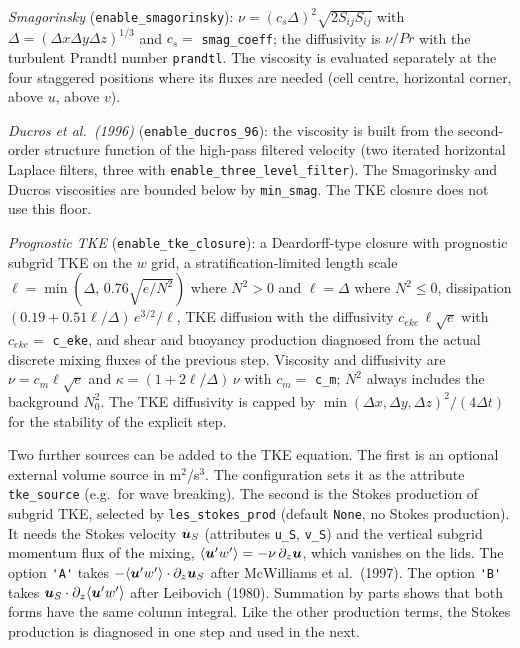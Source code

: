 \documentclass[12pt]{article}
\renewcommand{\v}[1]{{\mbox{\boldmath$ #1 $}}}  %
\newcommand{\pz}[1]{{\partial_z #1}}
\begin{document}
\emph{Smagorinsky} (\verb|enable_smagorinsky|):
$\nu = (c_s \Delta)^2 \sqrt{2 S_{ij} S_{ij}}$ with
$\Delta = (\Delta x \Delta y \Delta z)^{1/3}$ and
$c_s = $ \verb|smag_coeff|; the diffusivity is $\nu/Pr$ with the turbulent
Prandtl number \verb|prandtl|. The viscosity is evaluated separately at
the four staggered positions where its fluxes are needed (cell centre,
horizontal corner, above $u$, above $v$).

\emph{Ducros et al.\ (1996)} (\verb|enable_ducros_96|): the viscosity is
built from the second-order structure function of the high-pass filtered
velocity (two iterated horizontal Laplace filters, three with
\verb|enable_three_level_filter|).
The Smagorinsky and Ducros viscosities are bounded below by
\verb|min_smag|. The TKE closure does not use this floor.

\emph{Prognostic TKE} (\verb|enable_tke_closure|): a Deardorff-type
closure with prognostic subgrid TKE on the $w$ grid, a
stratification-limited length scale
$\ell = \min(\Delta,\, 0.76 \sqrt{e/N^2})$ where $N^2 > 0$ and
$\ell = \Delta$ where $N^2 \le 0$, dissipation
$(0.19 + 0.51 \ell/\Delta)\, e^{3/2}/\ell$, TKE diffusion with the
diffusivity $c_{eke}\, \ell \sqrt{e}$ with $c_{eke} = $ \verb|c_eke|,
and shear and
buoyancy production diagnosed from the actual discrete mixing fluxes of
the previous step. Viscosity and diffusivity are
$\nu = c_m \ell \sqrt{e}$ and $\kappa = (1 + 2\ell/\Delta)\, \nu$ with
$c_m = $ \verb|c_m|; $N^2$ always includes the background $N_0^2$.
The TKE diffusivity is capped by
$\min(\Delta x, \Delta y, \Delta z)^2/(4\Delta t)$ for the stability of
the explicit step.

Two further sources can be added to the TKE equation. The first is an
optional external volume source in m$^2$/s$^3$. The configuration sets it
as the attribute \verb|tke_source| (e.g.\ for wave breaking). The second
is the Stokes production of subgrid TKE, selected by
\verb|les_stokes_prod| (default \verb|None|, no Stokes production). It
needs the Stokes velocity $\v u_S$ (attributes \verb|u_S|, \verb|v_S|)
and the vertical subgrid momentum flux of the mixing,
$\langle \v u' w' \rangle = -\nu\, \pz{\v u}$, which vanishes on the lids.
The option \verb|'A'| takes
$-\langle \v u' w' \rangle \cdot \pz{\v u_S}$ after
McWilliams et al.\ (1997). The option \verb|'B'| takes
$\v u_S \cdot \pz{\langle \v u' w' \rangle}$ after Leibovich (1980).
Summation by parts shows that both forms have the same column integral.
Like the other production terms, the Stokes production is diagnosed in
one step and used in the next.
\end{document}
